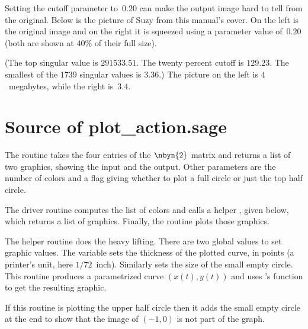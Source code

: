 Setting
the cutoff parameter to~$0.20$ can make the output image hard to tell
from the original.
Below is the picture of Suzy 
from this manual's cover.
On the left is the original image
and on the right it is squeezed using a parameter value of~$0.20$
(both are shown at $40$\% of their full size).
\begin{center}
  \quad
\end{center}
(The top singular value is 
$291533.51$.
The twenty percent cutoff is $129.23$. 
The smallest of the $1739$ singular values is $3.36$.)
The picture on the left is $4$~megabytes, 
while the right is~$3.4$.


\section{Source of plot\_action.sage}

The 
routine takes the four entries of the $\nbyn{2}$
matrix and returns a list of two graphics, showing the input and the
output.
Other parameters are the number of colors and a flag giving whether
to plot a full circle or just the top half circle.

The driver routine computes the list of colors and 
calls a helper , 
given below, which returns a list of graphics.
Finally, the routine plots those graphics.


The helper routine does the heavy lifting.
There are two global values to set graphic values.
The variable  sets the thickness of 
the plotted curve, in points (a printer's unit, here $1/72$~inch).
Similarly  sets the size of the small empty circle.
This routine produces a parametrized curve $(x(t),y(t))$ and uses \Sage's
 function to get the resulting graphic.

If this routine is plotting the upper half circle then it adds the
small empty circle at the end to show that the image of $(-1,0)$
is not part of the graph.




